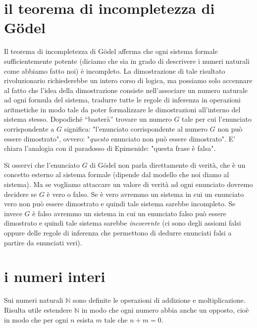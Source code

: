 \documentclass[italian,a4paper,hidelinks,headinclude]{scrartcl}
\newcommand{\NN}{{\mathbb N}}
\newcommand{\myemph}[1]{\emph{#1}\marginpar{#1}}
\begin{document}
\section{il teorema di incompletezza di G\"odel}

Il teorema di incompletezza di G\"odel afferma che ogni
sistema formale sufficientemente potente (diciamo che sia in grado di
descrivere i numeri naturali come abbiamo fatto noi) è incompleto.
La dimostrazione di tale risultato rivoluzionario richiederebbe un intero
corso di logica, ma possiamo solo accennare al fatto che l'idea della
dimostrazione consiste nell'associare un numero naturale ad ogni formula
del sistema, tradurre tutte le regole di inferenza in operazioni aritmetiche
in modo tale da poter formalizzare le dimostrazioni all'interno del sistema
stesso. Dopodiché ``basterà'' trovare un numero $G$ tale per cui
l'enunciato corrispondente a $G$ significa:
"l'enunciato corrispondente al numero $G$ non può essere dimostrato",
ovvero: "\emph{questo} enunciato non può essere dimostrato".
E' chiara l'analogia con il paradosso di Epimenide: "questa frase è falsa".

Si osservi che l'enunciato $G$ di G\"odel non parla direttamente di verità,
che è un concetto esterno al sistema formale
(dipende dal modello che noi diamo al sistema).
Ma se vogliamo attaccare un valore di verità ad ogni enunciato dovremo decidere
se $G$ è vero o falso. Se è vero avremmo un sistema in cui un enunciato vero
non può essere dimostrato e quindi tale sistema sarebbe incompleto.
Se invece $G$ è falso avremmo un sistema in cui un enunciato falso può essere
dimostrato e quindi tale sistema sarebbe \myemph{incoerente} (ci sono degli assiomi
falsi oppure delle regole di inferenza che permettono di dedurre enunciati falsi
a partire da enunciati veri).

\section{i numeri interi}

Sui numeri naturali $\NN$ sono definite le operazioni di addizione e moltiplicazione.
Risulta utile estendere $\NN$ in modo che ogni numero abbia anche un opposto, cioè in modo che per ogni $n$ esista $m$ tale che $n+m=0$.
\end{document}
